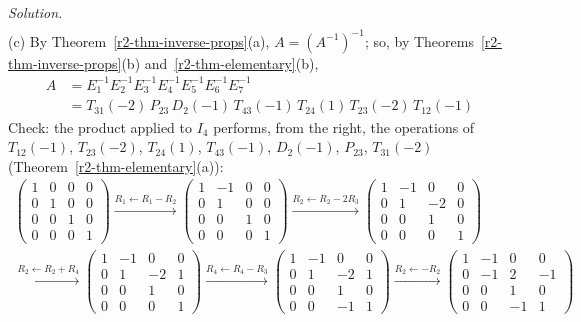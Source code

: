 \documentclass[12pt]{article}
\theoremstyle{definition}
\newenvironment{solution}{\par\noindent\textit{Solution.}\ }{\par\smallskip}
\begin{document}
\begin{solution}
\[\begin{gathered}
\end{gathered}
\]
(c) By Theorem~\ref{r2-thm-inverse-props}(a), \(A=(A^{-1})^{-1}\); so, by Theorems~\ref{r2-thm-inverse-props}(b)
and~\ref{r2-thm-elementary}(b),
\[
\begin{aligned}
A&=E_1^{-1}E_2^{-1}E_3^{-1}E_4^{-1}E_5^{-1}E_6^{-1}E_7^{-1}\\
&=T_{31}(-2)\,P_{23}\,D_2(-1)\,T_{43}(-1)\,T_{24}(1)\,T_{23}(-2)\,T_{12}(-1)
\end{aligned}
\]
Check: the product applied to \(I_4\) performs, from the right, the operations of \(T_{12}(-1)\), \(T_{23}(-2)\),
\(T_{24}(1)\), \(T_{43}(-1)\), \(D_2(-1)\), \(P_{23}\), \(T_{31}(-2)\) (Theorem~\ref{r2-thm-elementary}(a)):
\[
\begin{gathered}
\begin{pmatrix}1&0&0&0\\0&1&0&0\\0&0&1&0\\0&0&0&1\end{pmatrix}
\xrightarrow{R_1\leftarrow R_1-R_2}
\begin{pmatrix}1&-1&0&0\\0&1&0&0\\0&0&1&0\\0&0&0&1\end{pmatrix}
\xrightarrow{R_2\leftarrow R_2-2R_3}
\begin{pmatrix}1&-1&0&0\\0&1&-2&0\\0&0&1&0\\0&0&0&1\end{pmatrix}
\\
\xrightarrow{R_2\leftarrow R_2+R_4}
\begin{pmatrix}1&-1&0&0\\0&1&-2&1\\0&0&1&0\\0&0&0&1\end{pmatrix}
\xrightarrow{R_4\leftarrow R_4-R_3}
\begin{pmatrix}1&-1&0&0\\0&1&-2&1\\0&0&1&0\\0&0&-1&1\end{pmatrix}
\xrightarrow{R_2\leftarrow-R_2}
\begin{pmatrix}1&-1&0&0\\0&-1&2&-1\\0&0&1&0\\0&0&-1&1\end{pmatrix}
\\

\end{gathered}\]
\end{solution}
\end{document}
